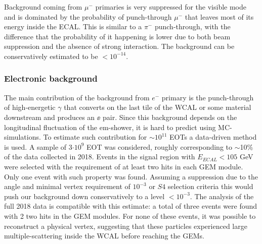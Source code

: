 Background coming from $\mu^-$ primaries is very suppressed for the visible mode and is dominated by the probability of punch-through $\mu^-$ that leaves most of its energy inside the ECAL. This is similar to a $\pi^-$ punch-through, with the difference that the probability of it happening is lower due to both beam suppression and the absence of strong interaction. The background can be conservatively estimated to be $<10^{-14}$.

\subsubsection{Electronic background}
\label{ch3:sec:bkg:vis:elec}

The main contribution of the background from $e^-$ primary is the punch-through of high-energetic $\gamma$ that converts on the last tile of the WCAL or some material downstream and produces an $\ee$ pair. Since this background depends on the longitudinal fluctuation of the em-shower, it is hard to predict using MC-simulations. To estimate such contribution for $\sim10^{11}$ EOTs a data-driven method is used. A sample of 3$\cdot 10^9$ EOT was considered, roughly corresponding to $\sim$10\% of the data collected in 2018. Events in the signal region with $E_{ECAL} < 105$ GeV were selected with the requirement of at least two hits in each GEM module. Only one event with such property was found. Assuming a suppression due to the angle and minimal vertex requirement of $10^{-3}$ or $S4$ selection criteria this would push our background down conservatively to a level $<10^{-3}$. The analysis of the full 2018 data is compatible with this estimate: a total of three events were found with 2 two hits in the GEM modules. For none of these events, it was possible to reconstruct a physical vertex, suggesting that these particles experienced large multiple-scattering inside the WCAL before reaching the GEMs.


